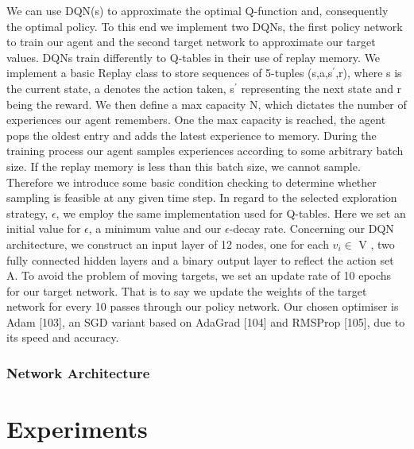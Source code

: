 \documentclass[runningheads]{llncs}
\begin{document}
We can use DQN(s) to approximate the optimal Q-function and, consequently the optimal policy. To this end we implement two DQNs, the first policy network to train our agent and the second target network to approximate our target values. DQNs train differently to Q-tables in their use of replay memory. We implement a basic Replay class to store sequences of 5-tuples (s,a,s$^{\prime}$,r), where s is the current state, a denotes the action taken, s$^{\prime}$ representing the next state and r being the reward. We then define a max capacity N, which dictates the number of experiences our agent remembers. One the max capacity
is reached, the agent pops the oldest entry and adds the latest experience to memory. During the training process our agent samples experiences according to some arbitrary batch size. If the replay memory is less than this batch size, we cannot sample. Therefore we introduce some basic condition checking to determine whether sampling is feasible at any given time step. In regard to the selected exploration strategy, $\epsilon$, we employ the same implementation used for Q-tables. Here we set an initial value for $\epsilon$, a minimum value
and our $\epsilon$-decay rate. Concerning our DQN architecture, we construct an input layer of 12 nodes, one for each $v_{i} \in$ V , two fully connected hidden layers and a binary output layer to reflect the action set A. To avoid the problem of moving targets, we set an update rate of 10 epochs for our target network. That is to say we update the weights of the target network for every 10 passes through our policy network. Our chosen optimiser is Adam [103], an SGD variant based on AdaGrad [104] and RMSProp [105], due to its speed and accuracy.
\subsubsection{Network Architecture}

\section{Experiments}
\end{document}
